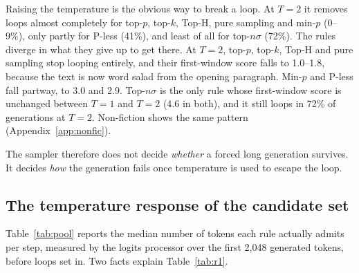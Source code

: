 \documentclass{article}
\newcommand{\pless}{P-less}
\begin{document}
\begin{table}[t]
\centering
\caption{\textbf{Forced to 16K tokens, every sampler collapses at $T{=}1$. Raising $T$ changes how each one fails.} Ten models, eight fiction genres, seed 1, about 70 generations per cell. Loop: fraction of generations ending in a terminal loop. First / Last: judge overall score (1--10) for the first and final 1.5K-token windows.}
\label{tab:r1}
\small

\end{table}

Raising the temperature is the obvious way to break a loop. At $T{=}2$ it removes loops almost completely for top-$p$, top-$k$, Top-H, pure sampling and min-$p$ (0--9\%), only partly for \pless{} (41\%), and least of all for top-$n\sigma$ (72\%). The rules diverge in what they give up to get there. At $T{=}2$, top-$p$, top-$k$, Top-H and pure sampling stop looping entirely, and their first-window score falls to 1.0--1.8, because the text is now word salad from the opening paragraph. Min-$p$ and \pless{} fall partway, to 3.0 and 2.9. Top-$n\sigma$ is the only rule whose first-window score is unchanged between $T{=}1$ and $T{=}2$ (4.6 in both), and it still loops in 72\% of generations at $T{=}2$. Non-fiction shows the same pattern (Appendix~\ref{app:nonfic}).

The sampler therefore does not decide \emph{whether} a forced long generation survives. It decides \emph{how} the generation fails once temperature is used to escape the loop.

\subsection{The temperature response of the candidate set}
\label{sec:mechanism}

Table~\ref{tab:pool} reports the median number of tokens each rule actually admits per step, measured by the logits processor over the first 2,048 generated tokens, before loops set in. Two facts explain Table~\ref{tab:r1}.

\begin{table}[t]
\centering
\caption{\textbf{How the realized candidate set responds to temperature predicts how each sampler fails.} Median candidate-set size per decoding step over the first 2,048 tokens of the Table~\ref{tab:r1} generations (ten models). Singleton: fraction of steps at $T{=}1$ where only one token is admitted.}
\label{tab:pool}
\small

\end{table}
\end{document}
